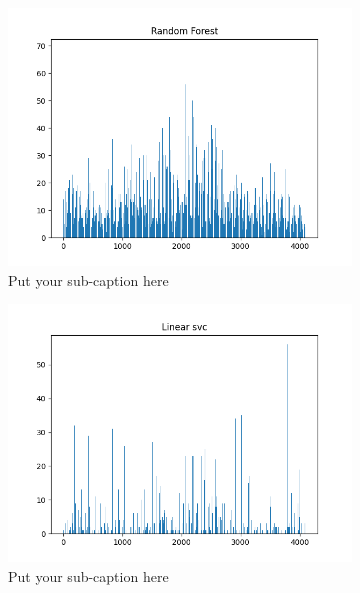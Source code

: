 \documentclass{article}
\begin{document}
\begin{figure}[H]
\begin{subfigure}{.33\textwidth}
  \centering
  \includegraphics[width=1\linewidth]{1e/Cats 5 clusters/selected RandomForest.png}  
  \caption{Put your sub-caption here}
  \label{rndf selection cat}
\end{subfigure}
\begin{subfigure}{.33\textwidth}
  \centering
  \includegraphics[width=1\linewidth]{1e/Cats 5 clusters/selected LinearSvc.png}  
  \caption{Put your sub-caption here}
  \label{linear svc selection cat}
\end{subfigure}
\begin{subfigure}{.33\textwidth}

\end{subfigure}
\end{figure}
\end{document}
